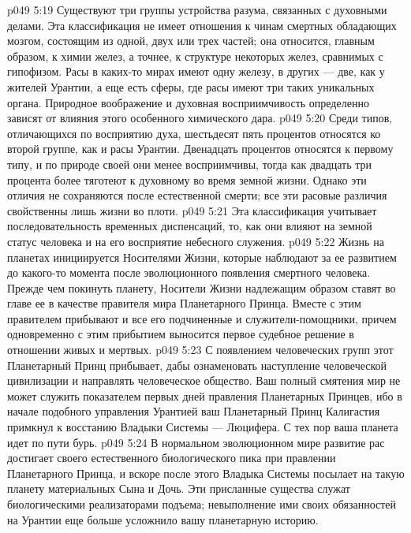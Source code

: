 \vs p049 5:19 \bibnobreakspace {} Существуют три группы устройства разума, связанных с духовными делами. Эта классификация не имеет отношения к чинам смертных обладающих мозгом, состоящим из одной, двух или трех частей; она относится, главным образом, к химии желез, а точнее, к структуре некоторых желез, сравнимых с гипофизом. Расы в каких\hyp{}то мирах имеют одну железу, в других --- две, как у жителей Урантии, а еще есть сферы, где расы имеют три таких уникальных органа. Природное воображение и духовная восприимчивость определенно зависят от влияния этого особенного химического дара.
\vs p049 5:20 Среди типов, отличающихся по восприятию духа, шестьдесят пять процентов относятся ко второй группе, как и расы Урантии. Двенадцать процентов относятся к первому типу, и по природе своей они менее восприимчивы, тогда как двадцать три процента более тяготеют к духовному во время земной жизни. Однако эти отличия не сохраняются после естественной смерти; все эти расовые различия свойственны лишь жизни во плоти.
\vs p049 5:21 \bibnobreakspace {} Эта классификация учитывает последовательность временных диспенсаций, то, как они влияют на земной статус человека и на его восприятие небесного служения.
\vs p049 5:22 Жизнь на планетах инициируется Носителями Жизни, которые наблюдают за ее развитием до какого\hyp{}то момента после эволюционного появления смертного человека. Прежде чем покинуть планету, Носители Жизни надлежащим образом ставят во главе ее в качестве правителя мира Планетарного Принца. Вместе с этим правителем прибывают и все его подчиненные и служители\hyp{}помощники, причем одновременно с этим прибытием выносится первое судебное решение в отношении живых и мертвых.
\vs p049 5:23 С появлением человеческих групп этот Планетарный Принц прибывает, дабы ознаменовать наступление человеческой цивилизации и направлять человеческое общество. Ваш полный смятения мир не может служить показателем первых дней правления Планетарных Принцев, ибо в начале подобного управления Урантией ваш Планетарный Принц Калигастия примкнул к восстанию Владыки Системы --- Люцифера. С тех пор ваша планета идет по пути бурь.
\vs p049 5:24 В нормальном эволюционном мире развитие рас достигает своего естественного биологического пика при правлении Планетарного Принца, и вскоре после этого Владыка Системы посылает на такую планету материальных Сына и Дочь. Эти присланные существа служат биологическими реализаторами подъема; невыполнение ими своих обязанностей на Урантии еще больше усложнило вашу планетарную историю.
